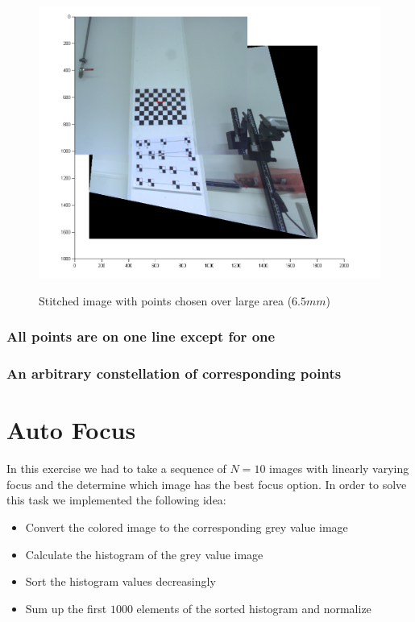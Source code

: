 \documentclass[
a4paper,     %
12pt         %
]{scrartcl}  %
\begin{document}
\begin{figure}[ht!]
 \centering
 \includegraphics[scale=0.5]{./Bildg_Messtechnik_Lab/PanoramaStitching/figb2.png}
 \label{fig:differentareastitch6.5mm}
 \caption{Stitched image with points chosen over large area ($6.5mm$)}
\end{figure}

\subsubsection{All points are on one line except for one}
\subsubsection{An arbitrary constellation of corresponding points}

\pagebreak

\section{Auto Focus}

In this exercise we had to take a sequence of $N=10$ images with linearly varying focus and the determine which image has the best focus option.
In order to solve this task we implemented the following idea:

\begin{itemize}
 \item Convert the colored image to the corresponding grey value image
 \item Calculate the histogram of the grey value image
 \item Sort the histogram values decreasingly
 \item Sum up the first $1000$ elements of the sorted histogram and normalize
\end{itemize}
\end{document}
